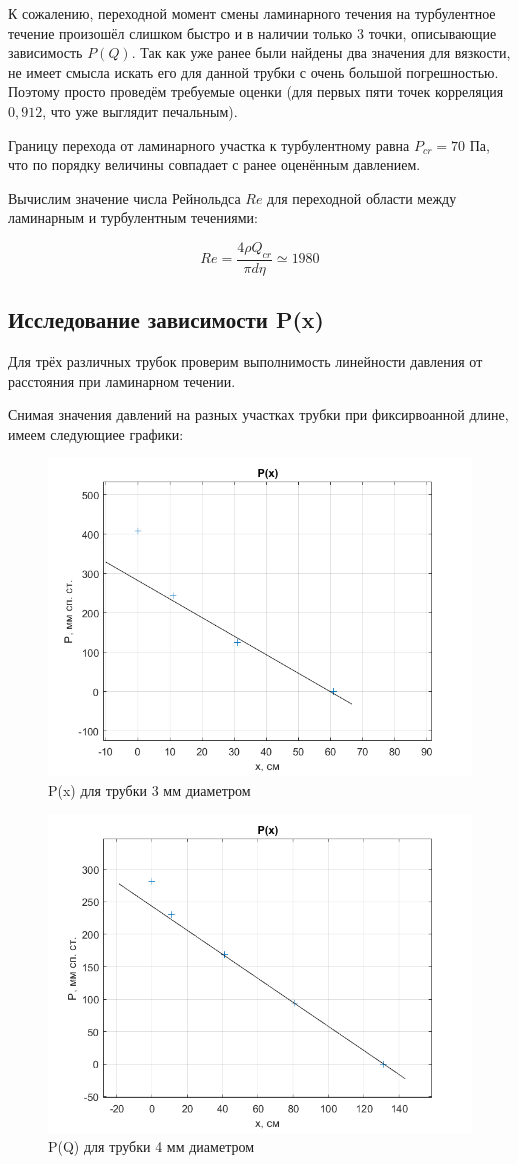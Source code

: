 \documentclass[a4paper, 12pt]{article} %
\begin{document}
К сожалению, переходной момент смены ламинарного течения на турбулентное течение произошёл слишком быстро и в наличии только 3 точки, описывающие зависимость $P(Q)$. Так как уже ранее были найдены два значения для вязкости, не имеет смысла искать его для данной трубки с очень большой погрешностью. Поэтому просто проведём требуемые оценки (для первых пяти точек корреляция $0,912$, что уже выглядит печальным).

Границу перехода от ламинарного участка к турбулентному равна $P_{cr} = 70$ Па, что по порядку величины совпадает с ранее оценённым давлением.

Вычислим значение числа Рейнольдса $Re$ для переходной области между ламинарным и турбулентным течениями:

\begin{equation}
	Re = \frac{4 \rho Q_{cr}}{\pi d \eta} \simeq 1980
\end{equation}

\subsection{Исследование зависимости P(x)}

Для трёх различных трубок проверим выполнимость линейности давления от расстояния при ламинарном течении.

Снимая значения давлений на разных участках трубки при фиксирвоанной длине, имеем следующиее графики:

\begin{figure}[!h]
    \centering
    \includegraphics[width = 9 cm]{pl3}
    \caption{P(x) для трубки 3 мм диаметром}
    \label{fig:vac}
\end{figure}


\begin{figure}[!h]
    \centering
    \includegraphics[width = 9 cm]{pl4}
    \caption{P(Q) для трубки 4 мм диаметром}
    \label{fig:vac}
\end{figure}
\end{document}
